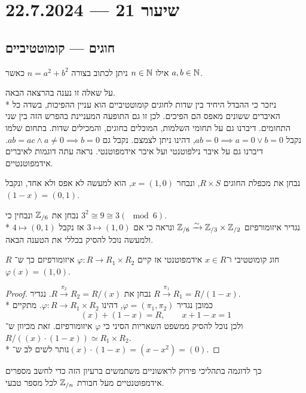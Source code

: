 \section{שיעור 21 --- 22.7.2024}
\subsection{חוגים --- קומוטטיביים}
\begin{exercise}
	אילו $n \in \mathbb{N}$ ניתן לכתוב בצורה $n = a^2 + b^2$ כאשר $a, b \in \mathbb{N}$.
\end{exercise}
על שאלה זו נענה בהרצאה הבאה. \\*
ניזכר כי ההבדל היחיד בין שדות לחוגים קומוטטיביים הוא עניין ההפיכות, בשדה כל האיברים ששונים מאפס הם הפיכים.
לכן זו גם התופעה המעניינת בהפרש הזה בין שני התחומים.
דיברנו גם על תחומי השלמות, המוכלים בחוגים, והמכילים שדות.
בתחום שלמו נקבל $a b = 0 \implies a = 0 \lor b = 0$, דהינו ניתן לצמצם.
נקבל גם $a b = ac \land a \ne 0 \implies b = 0$.
דיברנו גם על איבר נילפוטנטי ועל איבר אידמפוטנטי.
נראה עתה דוגמות לאיברים אידמפוטנטיים.
\begin{example}
	נבחן את מכפלת החוגים $R \times S$, ונבחר $x = (1, 0)$, הוא למעשה לא אפס ולא אחד, ונקבל $(1 - x) = (0, 1)$.
\end{example}
\begin{example}
	נבחן את $\mathbb{Z}_{/6}$ ונבחין כי $3^2 \cong 9 \cong 3 (\mod 6)$. \\*
	נגדיר איזומורפיזם $\mathbb{Z}_{/6} \xrightarrow{\sim} \mathbb{Z}_{/3} \times \mathbb{Z}_{/2}$ ונראה כי אם $3 \mapsto (1, 0)$ אז נקבל $4 \mapsto (0, 1)$ ולמעשה נוכל להסיק בכללי את הטענה הבאה.
\end{example}
\begin{proposition}
	$R$ חוג קומוטטיבי ו־$x \in R$ אידמפוטנטי אז קיים $\varphi : R \to R_1 \times R_2$ איזומורפיזם כך ש־$\varphi(x) = (1, 0)$.
\end{proposition}
\begin{proof}
	נבחן את $R \xrightarrow{\pi_2} R_2 = R / (x)$. נגדיר $R \xrightarrow{\pi_1} R_1 = R / (1 - x)$. \\*
	כמובן נגדיר $\varphi = (\pi_1, \pi_2)$, דהינו $\varphi : R \to R_1 \times R_2$. מתקיים
	\[
		(x) + (1 - x) = R,
		\qquad
		x + 1 - x = 1
	\]
	ולכן נוכל להסיק ממשפט השאריות הסיני כי $\varphi$ איזומורפיזם.
	זאת מכיוון ש־$R / ((x) \cdot (1 - x)) \simeq R_1 \times R_2$. \\*
	נותר לשים לב ש־$(x) \cdot (1 - x) = (x - x^2) = (0)$.
\end{proof}
כך לדוגמה בתהליכי פירוק לראשוניים משתמשים ברעיון הזה כדי לחשב מספרים אידמפוטנטיים מעל חבורת $\mathbb{Z}_{/n}$ לכל מספר טבעי.
